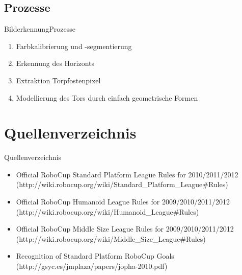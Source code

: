\documentclass{beamer}
\begin{document}
\subsection{Prozesse}
\begin{frame}{Bilderkennung}{Prozesse}
\begin{enumerate}
    \item Farbkalibrierung und -segmentierung
    \item Erkennung des Horizonts
    \item Extraktion Torpfostenpixel
    \item Modellierung des Tors durch einfach geometrische Formen
\end{enumerate}
\end{frame}

\section*{Quellenverzeichnis}
\begin{frame}{Quellenverzeichnis}
\begin{tiny}
\begin{itemize}
    \item Official RoboCup Standard Platform League Rules for 2010/2011/2012  (http://wiki.robocup.org/wiki/Standard\_Platform\_League\#Rules)
    \item Official RoboCup Humanoid League Rules for 2009/2010/2011/2012 (http://wiki.robocup.org/wiki/Humanoid\_League\#Rules)
    \item Official RoboCup Middle Size League Rules for 2009/2010/2011/2012 (http://wiki.robocup.org/wiki/Middle\_Size\_League\#Rules)
    \item Recognition of Standard Platform RoboCup Goals (http://gsyc.es/jmplaza/papers/jopha-2010.pdf)
\end{itemize}
\end{tiny}
\end{frame}
\end{document}
